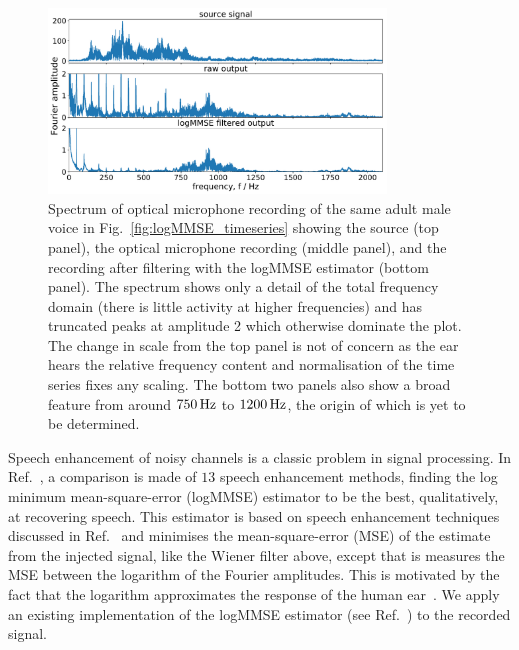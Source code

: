 \documentclass[paper-main.tex]{subfiles}
\begin{document}
\begin{figure}
	\includegraphics[width=0.8\textwidth]{figures/combined_spectrum_melatos.pdf}
	\caption{Spectrum of optical microphone recording of the same adult male voice in Fig.~\ref{fig:logMMSE_timeseries} showing the source (top panel), the optical microphone recording (middle panel), and the recording after filtering with the logMMSE estimator (bottom panel). The spectrum shows only a detail of the total frequency domain (there is little activity at higher frequencies) and has truncated peaks at amplitude 2 which otherwise dominate the plot. The change in scale from the top panel is not of concern as the ear hears the relative frequency content and normalisation of the time series fixes any scaling. The bottom two panels also show a broad feature from around $750\,{\rm Hz}$ to $1200\,{\rm Hz}$, the origin of which is yet to be determined.}
	\label{fig:logMMSE_spectrum}
\end{figure}


Speech enhancement of noisy channels is a classic problem in signal processing. 
In Ref.~\cite{SubjectiveComparison}, a comparison is made of $13$ speech enhancement methods, finding the log minimum mean-square-error (logMMSE) estimator to be the best, qualitatively, at recovering speech. 
This estimator is based on speech enhancement techniques discussed in Ref.~\cite{Ephraim1984SpeechEU_logMMSE} and minimises the mean-square-error (MSE) of the estimate from the injected signal, like the Wiener filter above, except that is measures the MSE between the logarithm of the Fourier amplitudes. This is motivated by the fact that the logarithm approximates the response of the human ear~\cite{SubjectiveComparison}. We apply an existing implementation of the logMMSE estimator (see Ref.~\cite{logmmse}) to the recorded signal.
\end{document}
